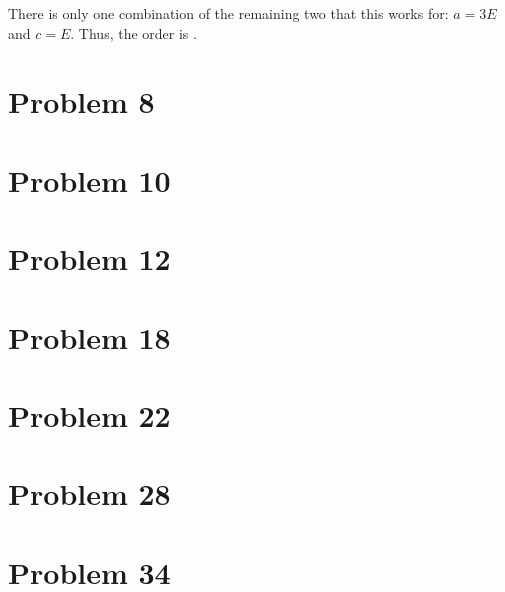 \documentclass[12pt]{article}
\begin{document}
There is only one combination of the remaining two that this works for: $a = 3E$ and $c = E$. Thus, the order is \boxed{\langle 3\sigma, 2\sigma, \sigma \rangle}.

\pagebreak
\section{Problem 8}

\section{Problem 10}

\section{Problem 12}

\section{Problem 18}

\section{Problem 22}

\section{Problem 28}

\section{Problem 34}
\end{document}
